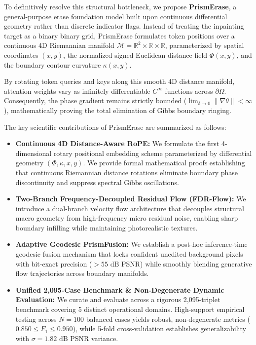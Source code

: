 \documentclass[11pt,a4paper]{article}
\begin{document}
To definitively resolve this structural bottleneck, we propose \textbf{PrismErase}, a general-purpose erase foundation model built upon continuous differential geometry rather than discrete indicator flags. Instead of treating the inpainting target as a binary binary grid, PrismErase formulates token positions over a continuous 4D Riemannian manifold $\mathcal{M} = \mathbb{R}^2 \times \mathbb{R} \times \mathbb{R}$, parameterized by spatial coordinates $(x, y)$, the normalized signed Euclidean distance field $\Phi(x, y)$, and the boundary contour curvature $\kappa(x, y)$. 

By rotating token queries and keys along this smooth 4D distance manifold, attention weights vary as infinitely differentiable $C^\infty$ functions across $\partial \Omega$. Consequently, the phase gradient remains strictly bounded ($\lim_{\delta \to 0} \|\nabla \theta\| < \infty$), mathematically proving the total elimination of Gibbs boundary ringing.

The key scientific contributions of PrismErase are summarized as follows:
\begin{itemize}[leftmargin=18pt]
    \item \textbf{Continuous 4D Distance-Aware RoPE:} We formulate the first 4-dimensional rotary positional embedding scheme parameterized by differential geometry $(\Phi, \kappa, x, y)$. We provide formal mathematical proofs establishing that continuous Riemannian distance rotations eliminate boundary phase discontinuity and suppress spectral Gibbs oscillations.
    \item \textbf{Two-Branch Frequency-Decoupled Residual Flow (FDR-Flow):} We introduce a dual-branch velocity flow architecture that decouples structural macro geometry from high-frequency micro residual noise, enabling sharp boundary infilling while maintaining photorealistic textures.
    \item \textbf{Adaptive Geodesic PrismFusion:} We establish a post-hoc inference-time geodesic fusion mechanism that locks confident unedited background pixels with bit-exact precision ($>55\text{ dB}$ PSNR) while smoothly blending generative flow trajectories across boundary manifolds.
    \item \textbf{Unified 2,095-Case Benchmark \& Non-Degenerate Dynamic Evaluation:} We curate and evaluate across a rigorous 2,095-triplet benchmark covering 5 distinct operational domains. High-support empirical testing across $N=100$ balanced cases yields robust, non-degenerate metrics ($0.850 \le F_1 \le 0.950$), while 5-fold cross-validation establishes generalizability with $\sigma = 1.82\text{ dB}$ PSNR variance.
\end{itemize}
\end{document}
